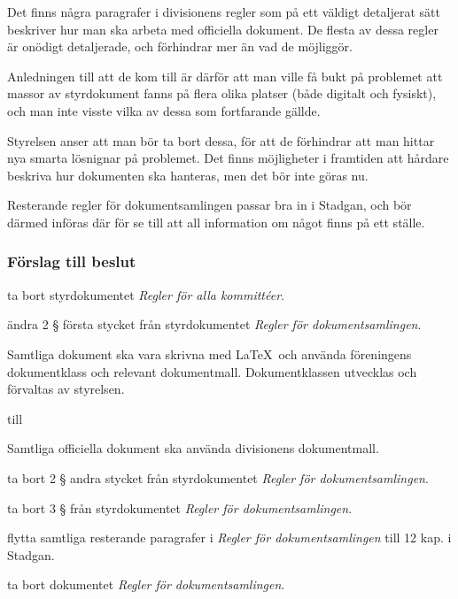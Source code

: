 \documentclass[protokoll]{dvd}
\begin{document}
Det finns några paragrafer i divisionens regler som på ett väldigt detaljerat sätt beskriver hur man ska arbeta med officiella dokument.
De flesta av dessa regler är onödigt detaljerade, och förhindrar mer än vad de möjliggör.

Anledningen till att de kom till är därför att man ville få bukt på problemet att massor av styrdokument fanns på flera olika platser (både digitalt och fysiskt), och man inte visste vilka av dessa som fortfarande gällde.

Styrelsen anser att man bör ta bort dessa, för att de förhindrar att man hittar nya smarta lösnignar på problemet.
Det finns möjligheter i framtiden att hårdare beskriva hur dokumenten ska hanteras, men det bör inte göras nu.

Resterande regler för dokumentsamlingen passar bra in i Stadgan, och bör därmed införas där för se till att all information om något finns på ett ställe.

\subsubsection*{Förslag till beslut}

\begin{attsatser}
	\item ta bort styrdokumentet \emph{Regler för alla kommittéer}.

	\item ändra 2 § första stycket från styrdokumentet \emph{Regler för dokumentsamlingen}.

	\begin{displayquote}
		Samtliga dokument ska vara skrivna med \LaTeX~och använda föreningens dokumentklass och relevant dokumentmall.
		Dokumentklassen utvecklas och förvaltas av styrelsen.
	\end{displayquote}

	till

	\begin{displayquote}
		Samtliga officiella dokument ska använda divisionens dokumentmall.
	\end{displayquote}

	\item ta bort 2 § andra stycket från styrdokumentet \emph{Regler för dokumentsamlingen}.

	\item ta bort 3 § från styrdokumentet \emph{Regler för dokumentsamlingen}.

	\item flytta samtliga resterande paragrafer i \emph{Regler för dokumentsamlingen} till 12 kap. i Stadgan.

	\item ta bort dokumentet \emph{Regler för dokumentsamlingen}.
\end{attsatser}
\end{document}
